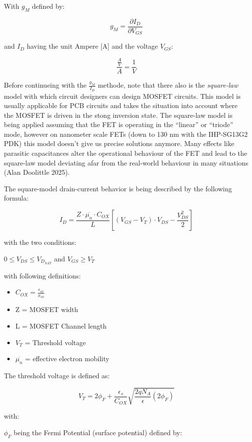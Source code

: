 \documentclass[
  letterpaper,
]{scrbook}
\providecommand{\tightlist}{%
  \setlength{\itemsep}{0pt}\setlength{\parskip}{0pt}}
\begin{document}
With \(g_{M}\) defined by:

\[
g_{M} = \frac{\partial I_D}{\partial V_{GS}}
\]

and \(I_{D}\) having the unit Ampere {[}A{]} and the voltage \(V_{GS}\):

\[
\frac{\frac{A}{V}}{A} = \frac{1}{V}
\]

Before continueing with the \(\frac{g_{M}}{I_{D}}\) methode, note that
there also is the \emph{square-law} model with which circuit designers
can design MOSFET circuits. This model is usually applicable for PCB
circuits and takes the situation into account where the MOSFET is driven
in the stong inversion state. The square-law model is being applied
assuming that the FET is operating in the ``linear'' or ``triode'' mode,
however on nanometer scale FETs (down to 130 nm with the IHP-SG13G2 PDK)
this model doesn't give us precise solutions anymore. Many effects like
parasitic capacitances alter the operational behaviour of the FET and
lead to the square-law model deviating afar from the real-world
behaviour in many situations (Alan Doolittle 2025).

The square-model drain-current behavior is being described by the
following formula:

\[
I_{D} = \frac{Z \cdot \overline{\mu_n} \cdot C_{OX}}{L} [(V_{GS} - V_{T}) \cdot V_{DS} - \frac{V_{DS}^2}{2}]
\]

with the two conditions:

\(0 \leq V_{DS} \leq V_{D_{SAT}}\) and \(V_{GS} \geq V_T\)

with following definitions:

\begin{itemize}
\tightlist
\item
  \(C_{OX} = \frac{\epsilon_{ox}}{x_{ox}}\)
\item
  Z = MOSFET width
\item
  L = MOSFET Channel length
\item
  \(V_T\) = Threshold voltage
\item
  \(\overline{\mu_n}\) = effective electron mobility
\end{itemize}

The threshold voltage is defined as:

\[
V_T = 2 \phi_F + \frac{\epsilon_s}{C_{OX}} \sqrt{\frac{2q N_{A}}{\epsilon} (2\phi_F)}
\]

with:

\(\phi_F\) being the Fermi Potential (surface potential) defined by:
\end{document}
